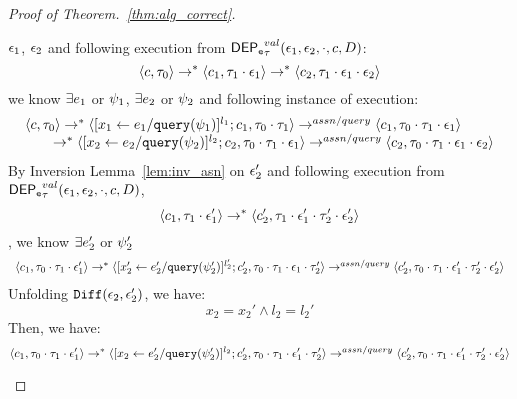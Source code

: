\begin{proof}[Proof of Theorem.~\ref{thm:alg_correct}]
\begin{case}[$P(\cdot)$]
 $\mathtt{\epsilon}_1$, $\mathtt{\epsilon}_2$ and following execution from $\mathsf{DEP_{\mathtt{e}}}^{val}_{\mathtt{\tau}}(\mathtt{\epsilon}_1, \mathtt{\epsilon}_2, \cdot, c, D)$:
 \[
 \langle {c}, \mathtt{\tau}_0 \rangle \rightarrow^{*} 
\langle {c}_1, \mathtt{\tau}_1 \cdot \mathtt{\epsilon}_1 \rangle  \rightarrow^{*} 
  \langle {c}_2,  \mathtt{\tau}_1 \cdot \mathtt{\epsilon}_1 \cdot \mathtt{\epsilon}_2  \rangle 
 \]
 we know $\exists e_1$ or $\psi_1$, $\exists e_2$ or $\psi_2$ and following instance of execution:
 \\
\begin{equation}
\label{eq:valdep_inv1}
  \begin{array}{l}   
\langle {c}, \mathtt{\tau}_0 \rangle \rightarrow^{*} 
\langle [\mathrel{ {x}_1 \leftarrow e_1 / {\tt query}(\psi_1) }]^{l_1} ; {c}_1, \mathtt{\tau}_0 \cdot \mathtt{\tau}_1 \rangle  
\rightarrow^{assn/query}
 \langle c_1, \mathtt{\tau}_0 \cdot \mathtt{\tau}_1 \cdot \mathtt{\epsilon}_1 \rangle \\
  \qquad \rightarrow^{*} 
  \langle [\mathrel{ {x}_2 \leftarrow e_2 / {\tt query}(\psi_2) }]^{l_2};{c}_2, 
  \mathtt{\tau}_0 \cdot \mathtt{\tau}_1 \cdot \mathtt{\epsilon}_1 \rangle 
  \rightarrow^{assn/query} 
  \langle {c}_2,  \mathtt{\tau}_0 \cdot \mathtt{\tau}_1 \cdot \mathtt{\epsilon}_1 \cdot \mathtt{\epsilon}_2 \rangle 
\end{array}
\end{equation}
%
%
By Inversion Lemma~\ref{lem:inv_asn} on 
$\mathtt{\epsilon}_2'$ and following execution from $\mathsf{DEP_{\mathtt{e}}}^{val}_{\mathtt{\tau}}(\mathtt{\epsilon}_1, \mathtt{\epsilon}_2, \cdot, c, D)$,
\[
\langle {c}_1, \mathtt{\tau}_1 \cdot \mathtt{\epsilon}_1' \rangle  \rightarrow^{*} 
  \langle {c}_2',  \mathtt{\tau}_1 \cdot \mathtt{\epsilon}_1' \cdot \mathtt{\tau}_2' \cdot \mathtt{\epsilon}_2'  \rangle 
  \], we know $\exists e_2'$ or $\psi_2'$
 \[
  \begin{array}{l}   
  \langle c_1, \mathtt{\tau}_0 \cdot \mathtt{\tau}_1 \cdot \mathtt{\epsilon}_1' \rangle 
  \rightarrow^{*} 
  \langle [\mathrel{ {x}_2' \leftarrow e_2' / {\tt query}(\psi_2') }]^{l_2'} ; {c}_2', \mathtt{\tau}_0 \cdot \mathtt{\tau}_1 \cdot \mathtt{\epsilon}_1 \cdot \mathtt{\tau}_2' \rangle 
  \rightarrow^{assn/query} 
  \langle {c}_2',  \mathtt{\tau}_0 \cdot \mathtt{\tau}_1 \cdot \mathtt{\epsilon}_1' \cdot \mathtt{\tau}_2' \cdot \mathtt{\epsilon}_2' \rangle 
\end{array}
 \]
%
Unfolding $\mathtt{Diff}(\mathtt{\epsilon}_2,\mathtt{\epsilon}_2')$, we have:
\[
  x_2 = x_2' \land l_2 = l_2' 
\] 
%
Then, we have:
\begin{equation}
\label{eq:valdep_inv2}
  \config{c_1, \vtrace_0 \cdot \vtrace_1 \cdot \event_1'} 
  \rightarrow^{*} 
  \config{[\assign{{x}_2}{\expr_2' / \query(\qexpr_2')}]^{l_2} ; {c}_2', \vtrace_0 \cdot \vtrace_1 \cdot \event_1' \cdot \vtrace_2'} 
  \rightarrow^{assn/query} 
  \config{{c}_2',  \vtrace_0 \cdot \vtrace_1 \cdot \event_1' \cdot \vtrace_2' \cdot \event_2'} 

\end{equation}
\end{case}
\end{proof}
